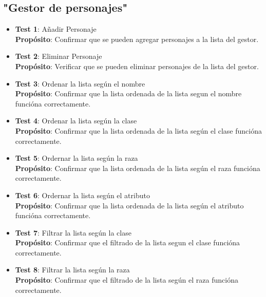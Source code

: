 \documentclass{article}
\begin{document}
\subsection{"Gestor de personajes"}
	\begin{itemize}

	\item \textbf{Test 1}: Añadir Personaje
\\ \textbf{Propósito}: Confirmar que se pueden agregar personajes a la lista del gestor.


	\item \textbf{Test 2}: Eliminar Personaje
\\ \textbf{Propósito}: Verificar que se pueden eliminar personajes de la lista del gestor.


	\item \textbf{Test 3}: Ordenar la lista según el nombre
\\ \textbf{Propósito}: Confirmar que la lista ordenada de la lista segun el nombre funcióna correctamente.


    \item \textbf{Test 4}: Ordenar la lista según la clase
\\ \textbf{Propósito}: Confirmar que la lista ordenada de la lista según el clase funcióna correctamente.


    \item \textbf{Test 5}: Ordernar la lista según la raza
\\ \textbf{Propósito}: Confirmar que la lista ordenada de la lista según el raza funcióna correctamente.


    \item \textbf{Test 6}: Ordernar la lista según el atributo
\\ \textbf{Propósito}: Confirmar que la lista ordenada de la lista según el atributo funcióna correctamente.


    \item \textbf{Test 7}: Filtrar la lista según la clase
\\ \textbf{Propósito}: Confirmar que el filtrado de la lista segun el clase funcióna correctamente.


    \item \textbf{Test 8}: Filtrar la lista según la raza
\\ \textbf{Propósito}: Confirmar que el filtrado de la lista según el raza funcióna correctamente.

\end{itemize}
\end{document}

